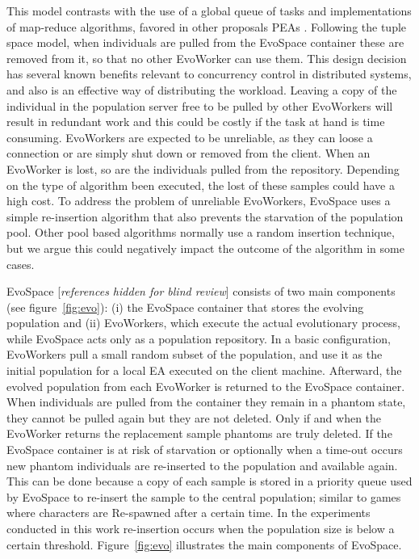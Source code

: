\documentclass{sig-alternate}
\begin{document}
This model contrasts with the use of a global queue of tasks and
implementations of map-reduce algorithms, favored in other proposals PEAs
\cite{fazenda2012,di2013towards,FlexGP}.
Following the tuple space model, when individuals are pulled from the EvoSpace
container these are removed from it, so that no other EvoWorker can use them.
This design decision has several known benefits relevant to concurrency control 
in distributed systems, and also is an effective way of distributing the workload.
Leaving a copy of the individual in the population server free to be pulled by other EvoWorkers will result in redundant work and this could be
costly if the task at hand is time consuming. EvoWorkers are expected to be 
unreliable, as they can loose a connection or are simply shut down or removed 
from the client. When an EvoWorker is lost, so are the individuals pulled from
the repository. Depending on the type of algorithm been executed, the lost of
these samples could have a high cost. To address the problem of unreliable 
EvoWorkers, EvoSpace uses a simple re-insertion algorithm that also 
prevents the starvation of the population pool. Other pool based algorithms
normally use a random insertion technique, but we argue this could negatively 
impact the outcome of the algorithm in some cases.



EvoSpace [{\em references hidden for blind review}] consists of two main components (see figure~\ref{fig:evo}): (i) the EvoSpace 
container that stores the evolving population and (ii) EvoWorkers, which execute 
the actual evolutionary process, while EvoSpace acts only as a population repository.
In a basic configuration, EvoWorkers pull a small random subset of the 
population, and use it as the initial population for a local EA executed 
on the client machine. Afterward, the evolved population from each EvoWorker 
is returned to the EvoSpace container. When individuals are pulled from the 
container they remain in a phantom state, they cannot be pulled again but 
they are not deleted. Only if and when the EvoWorker returns the replacement 
sample phantoms are truly deleted. If the EvoSpace container is at risk of 
starvation or optionally when a time-out occurs new phantom individuals are 
re-inserted to the population and available again. This can be done because a 
copy of each sample is stored in a priority queue used by EvoSpace to re-insert 
the sample to the central population; similar to games where characters are 
Re-spawned after a certain time. In the experiments conducted in this work 
re-insertion occurs when the population size is below a certain threshold. 
Figure~\ref{fig:evo} illustrates the main components of EvoSpace.
\end{document}
